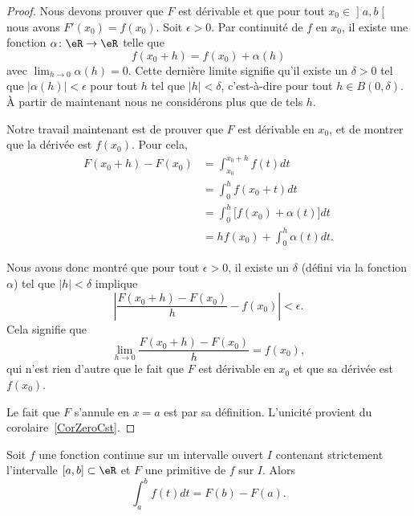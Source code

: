\begin{proof}
	Nous devons prouver que \( F\) est dérivable et que pour tout \( x_0\in\mathopen] a , b \mathclose[\) nous avons \( F'(x_0)=f(x_0)\). Soit \( \epsilon>0\). Par continuité de \( f\) en \( x_0\), il existe une fonction \( \alpha\colon \eR\to \eR\) telle que
	\begin{equation}
		f(x_0+h)=f(x_0)+\alpha(h)
	\end{equation}
	avec \( \lim_{h\to 0} \alpha(h)=0\). Cette dernière limite signifie qu'il existe un \( \delta>0\) tel que \( |\alpha(h)|<\epsilon\) pour tout \( h\) tel que \( | h |<\delta\), c'est-à-dire pour tout \( h\in B(0,\delta)\). À partir de maintenant nous ne considérons plus que de tels \( h\).

	Notre travail maintenant est de prouver que \( F\) est dérivable en \( x_0\), et de montrer que la dérivée est \( f(x_0)\). Pour cela,
	\begin{subequations}
		\begin{align}
			F(x_0+h)-F(x_0) & =\int_{x_0}^{x_0+h}f(t)dt               \\
			                & =\int_0^hf(x_0+t)dt                     \\
			                & =\int_0^h\big[ f(x_0)+\alpha(t) \big]dt \\
			                & =hf(x_0)+\int_0^{h}\alpha(t)dt.
		\end{align}
	\end{subequations}

	Nous avons donc montré que pour tout \( \epsilon>0\), il existe un \( \delta\) (défini via la fonction \( \alpha\)) tel que \( | h |<\delta\) implique
	\begin{equation}
		\left| \frac{ F(x_0+h)-F(x_0) }{ h }-f(x_0) \right| <\epsilon.
	\end{equation}
	Cela signifie que
	\begin{equation}
		\lim_{h\to 0} \frac{ F(x_0+h)-F(x_0) }{ h }=f(x_0),
	\end{equation}
	qui n'est rien d'autre que le fait que \( F\) est dérivable en \( x_0\) et que sa dérivée est \( f(x_0)\).

	Le fait que \( F\) s'annule en \( x=a\) est par sa définition. L'unicité provient du corolaire~\ref{CorZeroCst}.
\end{proof}

\begin{theorem}    \label{ThoRWXooTqHGbC}
	Soit \( f\) une fonction continue sur un intervalle ouvert \( I\) contenant strictement l'intervalle \( \mathopen[ a , b \mathclose]\subset \eR\) et \( F\) une primitive de \( f\) sur \( I\). Alors
	\begin{equation}
		\int_a^bf(t)dt=F(b)-F(a).
	\end{equation}
\end{theorem}

